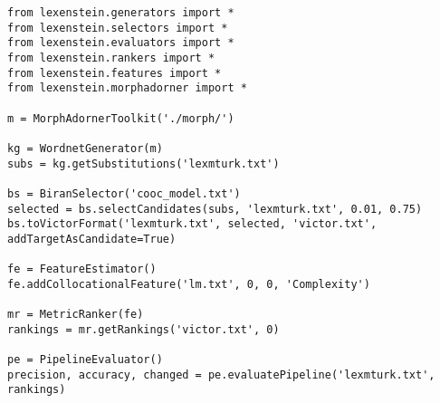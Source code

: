 \begin{lstlisting}
from lexenstein.generators import *
from lexenstein.selectors import *
from lexenstein.evaluators import *
from lexenstein.rankers import *
from lexenstein.features import *
from lexenstein.morphadorner import *

m = MorphAdornerToolkit('./morph/')

kg = WordnetGenerator(m)
subs = kg.getSubstitutions('lexmturk.txt')

bs = BiranSelector('cooc_model.txt')
selected = bs.selectCandidates(subs, 'lexmturk.txt', 0.01, 0.75)
bs.toVictorFormat('lexmturk.txt', selected, 'victor.txt', addTargetAsCandidate=True)

fe = FeatureEstimator()
fe.addCollocationalFeature('lm.txt', 0, 0, 'Complexity')

mr = MetricRanker(fe)
rankings = mr.getRankings('victor.txt', 0)

pe = PipelineEvaluator()
precision, accuracy, changed = pe.evaluatePipeline('lexmturk.txt', rankings)
\end{lstlisting}